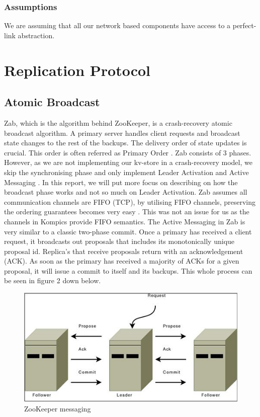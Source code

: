 \documentclass[12pt]{article}
\begin{document}
\subsubsection{Assumptions}
We are assuming that all our network based components have access to a perfect-link abstraction.

\section{Replication Protocol}

\subsection{Atomic Broadcast}
Zab, which is the algorithm behind ZooKeeper, is a crash-recovery atomic broadcast algorithm. A primary server handles client requests and broadcast state changes to the rest of the backups. The delivery order of state updates is crucial. This order is often referred as Primary Order \cite{Junqueira:2011:ZHB:2056308.2056409}. Zab consists of 3 phases. However, as we are not implementing our kv-store in a crash-recovery model, we skip the synchronising phase and only implement Leader Activation and Active Messaging \cite{zk-internals}.
\newline{}\newline{}
In this report, we will put more focus on describing on how the broadcast phase works and not so much on Leader Activation. Zab assumes all communication channels are FIFO (TCP), by utilising FIFO channels, preserving the ordering guarantees becomes very easy \cite{Reed:2008:STO:1529974.1529978}. This was not an issue for us as the channels in Kompics provide FIFO semantics. The Active Messaging in Zab is very similar to a classic two-phase commit.  Once a primary has received a client request, it broadcasts out proposals that includes its monotonically unique proposal id. Replica’s that receive proposals return with an acknowledgement (ACK). As soon as the primary has received a majority of ACKs for a given proposal, it will issue a commit to itself and its backups. This whole process can be seen in figure 2 down below.


\begin{figure}[H]
  \centering
  \includegraphics[scale=0.90]{img/2pc.jpg}
  \caption[Caption for LOF]{ZooKeeper messaging \protect \cite{zk-internals}}  
  \label{fig:picture}
\end{figure}
\end{document}
